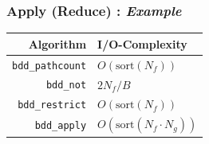 \documentclass[english, aspectratio=169]{beamer}
\newcommand{\sort}[0]{\text{sort}}
\begin{document}
\begin{frame}
  \frametitle{Apply (Reduce) : \emph{Example}}

  
\end{frame}

\begin{frame}
  \begin{table}
    \centering
    \begin{tabular}{rl}
      Algorithm                 & I/O-Complexity
      \\ \hline \hline
      \lstinline{bdd_pathcount} & $O(\sort(N_f))$
      \\ \hline
      \lstinline{bdd_not}       & $2 N_f / B$
      \\
      \lstinline{bdd_restrict}  & $O(\sort(N_f))$
      \\
      \lstinline{bdd_apply}     & $O(\sort(N_f \cdot N_g))$
    \end{tabular}
  \end{table}
\end{frame}


\end{document}
